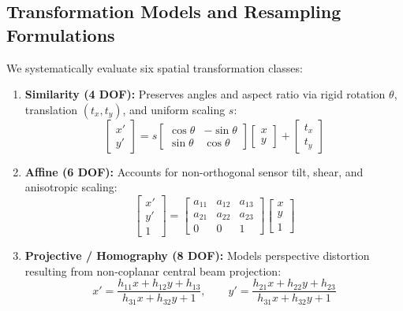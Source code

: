 \documentclass[11pt,a4paper]{article}
\begin{document}
\subsection{Transformation Models and Resampling Formulations}
We systematically evaluate six spatial transformation classes:
\begin{enumerate}
    \item \textbf{Similarity (4 DOF):} Preserves angles and aspect ratio via rigid rotation $\theta$, translation $(t_x, t_y)$, and uniform scaling $s$:
    \begin{equation}
        \begin{bmatrix} x' \\ y' \end{bmatrix} = s \begin{bmatrix} \cos\theta & -\sin\theta \\ \sin\theta & \cos\theta \end{bmatrix} \begin{bmatrix} x \\ y \end{bmatrix} + \begin{bmatrix} t_x \\ t_y \end{bmatrix}
    \end{equation}
    \item \textbf{Affine (6 DOF):} Accounts for non-orthogonal sensor tilt, shear, and anisotropic scaling:
    \begin{equation}
        \begin{bmatrix} x' \\ y' \\ 1 \end{bmatrix} = \begin{bmatrix} a_{11} & a_{12} & a_{13} \\ a_{21} & a_{22} & a_{23} \\ 0 & 0 & 1 \end{bmatrix} \begin{bmatrix} x \\ y \\ 1 \end{bmatrix}
    \end{equation}
    \item \textbf{Projective / Homography (8 DOF):} Models perspective distortion resulting from non-coplanar central beam projection:
    \begin{equation}
        x' = \frac{h_{11}x + h_{12}y + h_{13}}{h_{31}x + h_{32}y + 1}, \qquad y' = \frac{h_{21}x + h_{22}y + h_{23}}{h_{31}x + h_{32}y + 1}

\end{equation}
\end{enumerate}
\end{document}
